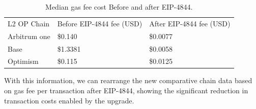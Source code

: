 \documentclass[fleqn,10pt]{olplainarticle}
\begin{document}
\begin{table}[H]
	\centering
	\begin{tabular}{lll}
		L2 OP Chain         & Before EIP-4844 fee (USD)  &  After EIP-4844 fee (USD) \cite{l2beat_onchain_nodate}  \\
		Arbitrum one        & \$0.140    & \$0.0077       \\
		Base                & \$1.3381   & \$0.0058        \\
		Optimism            & \$0.115    & \$0.0125        \\
	\end{tabular}
	\caption{Median gas fee cost Before and after EIP-4844.}
	\label{tab:EIP4844Table}
\end{table}

With this information, we can rearrange the new comparative chain data based on gas fee per transaction after EIP-4844, showing the significant reduction in transaction costs enabled by the upgrade.
\end{document}
